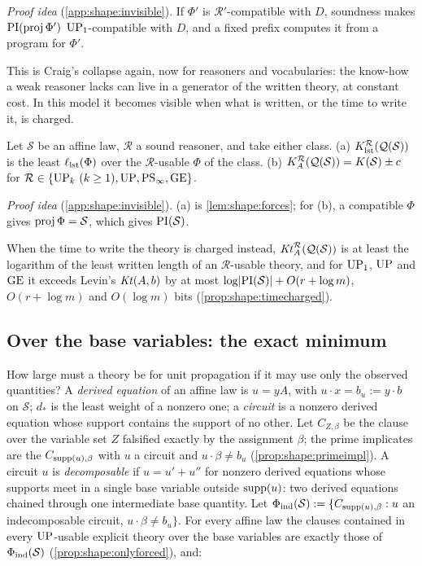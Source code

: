 \emph{Proof idea} (\cref{app:shape:invisible}). If $\Phi'$ is $\mathcal R'$-compatible with $D$, soundness makes $\mathrm{PI}(\operatorname{proj}\Phi')$ $\mathrm{UP}_1$-compatible with $D$, and a fixed prefix computes it from a program for $\Phi'$.

This is Craig's collapse again, now for reasoners and vocabularies: the know-how a weak reasoner lacks can live in a generator of the written theory, at constant cost. In this model it becomes visible when what is written, or the time to write it, is charged.

\begin{theorem}\label{thm:shape:visible}
Let $\mathcal S$ be an affine law, $\mathcal R$ a sound reasoner, and take either class.
(a) $K_{\mathrm{lst}}^{\mathcal R}(\mathcal Q(\mathcal S))$ is the least $\ell_{\rm lst}(\Phi)$ over the $\mathcal R$-usable $\Phi$ of the class.
(b) $K_{A}^{\mathcal R}(\mathcal Q(\mathcal S))=K(\mathcal S)\pm c$ for $\mathcal R\in\{\UP_k\ (k\ge1),\UP,\PS_\infty,\GE\}$.
\end{theorem}

\emph{Proof idea} (\cref{app:shape:invisible}). (a) is \cref{lem:shape:forces}; for (b), a compatible $\Phi$ gives $\operatorname{proj}\Phi=\mathcal S$, which gives $\mathrm{PI}(\mathcal S)$.

When the time to write the theory is charged instead, $\mathit{Kt}_{A}^{\mathcal R}(\mathcal Q(\mathcal S))$ is at least the logarithm of the least written length of an $\mathcal R$-usable theory, and for $\mathrm{UP}_1$, $\mathrm{UP}$ and $\mathrm{GE}$ it exceeds Levin's $\mathit{Kt}(A,b)$ by at most $\log\lvert\mathrm{PI}(\mathcal S)\rvert+O(r+\log m)$, $O(r+\log m)$ and $O(\log m)$ bits (\cref{prop:shape:timecharged}).

\subsection{Over the base variables: the exact minimum}\label{sec:shape:base}

How large must a theory be for unit propagation if it may use only the observed quantities? A \emph{derived equation} of an affine law is $u=yA$, with $u\cdot x=b_u:=y\cdot b$ on $\mathcal S$; $d_*$ is the least weight of a nonzero one; a \emph{circuit} is a nonzero derived equation whose support contains the support of no other. Let $C_{Z,\beta}$ be the clause over the variable set $Z$ falsified exactly by the assignment $\beta$; the prime implicates are the $C_{\operatorname{supp}(u),\beta}$ with $u$ a circuit and $u\cdot\beta\ne b_u$ (\cref{prop:shape:primeimpl}). A circuit $u$ is \emph{decomposable} if $u=u'+u''$ for nonzero derived equations whose supports meet in a single base variable outside $\operatorname{supp}(u)$: two derived equations chained through one intermediate base quantity. Let $\Phi_{\rm ind}(\mathcal S):=\{C_{\operatorname{supp}(u),\beta}:u$ an indecomposable circuit, $u\cdot\beta\ne b_u\}$. For every affine law the clauses contained in every $\mathrm{UP}$-usable explicit theory over the base variables are exactly those of $\Phi_{\rm ind}(\mathcal S)$ (\cref{prop:shape:onlyforced}), and:

